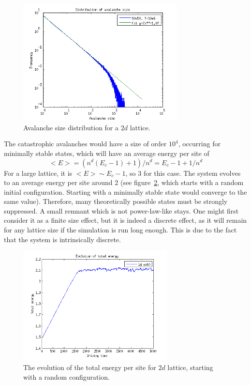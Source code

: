 \begin{figure}
\begin{center}
\includegraphics[width=0.75\textwidth]{results/2dsfit.png}
\caption{Avalanche size distribution for a $2d$ lattice. }
\label{sfit}
\end{center}
\end{figure}

The catastrophic avalanches would have a size of order $10^4$, occurring for minimally stable states, which will have an average energy per site of
\[
<E>=(n^d(E_c-1)+1)/n^d=E_c-1+1/n^d
\]
For a large lattice, it is $<E>\sim E_c-1$, so $3$ for this case. The system evolves to an average energy per site around $2$ (see figure~\ref{2e}, which starts with a random initial configuration. Starting with a minimally stable state would converge to the same value).
Therefore, many theoretically possible states must be strongly suppressed.
A small remnant which is not power-law-like stays. One might first consider it as a finite size effect,
but it is indeed a discrete effect, as it will remain for any lattice size if the simulation is run long enough.
This is due to the fact that the system is intrinsically discrete.

\begin{figure}
\begin{center}
\includegraphics[width=0.7\textwidth]{results/2e.png}
\caption{The evolution of the total energy per site for $2d$ lattice, starting with a random configuration. }
\label{2e}
\end{center}
\end{figure}

